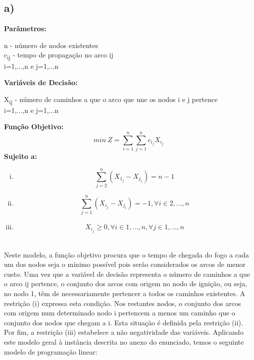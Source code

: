 \documentclass[11pt]{article} %
\begin{document}
\subsection*{a)}
\textbf{Parâmetros:}  \\
\begin{center}
n - número de nodos existentes \\
c\textsubscript{ij} - tempo de propagação no arco ij\\
i=1,...,n e j=1,...n \\
\end{center}
\textbf{Variáveis de Decisão:} \\
\begin{center}
X\textsubscript{ij} - número de caminhos a que o arco que une os nodos i e j pertence\\
i=1,...,n e j=1,...n \\
\end{center}
\textbf{Função Objetivo:} \\
$$min \ Z = \sum_{i=1}^{n} \sum_{j=1}^{n} c_i_jX_i_j$$
\textbf{Sujeito a:}
\begin{enumerate}[(i)]
\item $$\sum_{j=2}^{n} (X_1_j - X_j_1) = n-1$$
\item $$\sum_{j=1}^{n} (X_i_j - X_j_i) = -1, \forall i \in 2,...,n $$
\item $$X_i_j \geq 0, \forall i \in 1,...,n , \forall j \in 1,...,n$$
\end{enumerate}\\


Neste modelo, a função objetivo procura que o tempo de chegada do fogo a cada um dos nodos seja o mínimo possível pois serão considerados os arcos de menor custo. Uma vez que a variável de decisão representa o número de caminhos a que o arco ij pertence, o conjunto dos arcos com origem no nodo de ignição, ou seja, no nodo 1,  têm de necessariamente pertencer a todos os caminhos existentes. A restrição (i) expressa esta condição. Nos restantes nodos, o conjunto dos arcos com origem num determinado nodo i pertencem a menos um caminho que o conjunto dos nodos que chegam a i. Esta situação é definida pela restrição (ii). Por fim, a restrição (iii) estabelece a não negatividade das variáveis.
Aplicando este modelo geral à instância descrita no anexo do enunciado, temos o seguinte modelo de programação linear: 

\newpage
\end{document}

